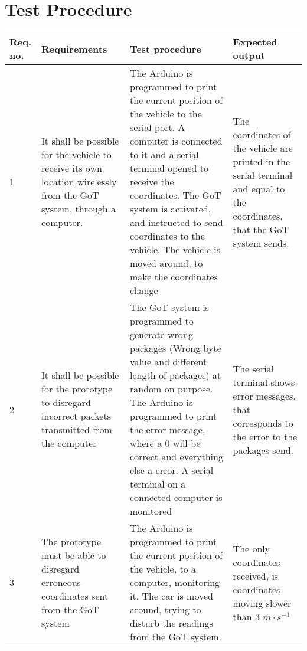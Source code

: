 \section{Test Procedure}\label{cha:TestProcedure}

\begin{table}[H] \centering
\begin{tabular}{|p{2cm}|p{5cm}|p{6cm}|p{3cm}|}
\hline%
\textbf{Req. no.}  &  \textbf{Requirements} &  \textbf{Test procedure}  &  \textbf{Expected output}        \\
\hline%
           1    &   It shall be possible for the vehicle to receive its own location wirelessly from the GoT system, through a computer.   &   The Arduino is programmed to print the current position of the vehicle to the serial port. A computer is connected to it and a serial terminal opened to receive the coordinates. The GoT system is activated, and instructed to send coordinates to the vehicle. The vehicle is moved around, to make the coordinates change   &   The coordinates of the vehicle are printed in the serial terminal and equal to the coordinates, that the GoT system sends. \\
\hline%
           2    &   It shall be possible for the prototype to disregard incorrect packets transmitted from the computer   &   The GoT system is programmed to generate wrong packages (Wrong byte value and different length of packages) at random on purpose. The Arduino is programmed to print the error message, where a 0 will be correct and everything else a error. A serial terminal on a connected computer is monitored  &  The serial terminal shows error messages, that corresponds to the error to the packages send. \\
\hline%
           3    &   The prototype must be able to disregard erroneous coordinates sent from the GoT system   &    The Arduino is programmed to print the current position of the vehicle, to a computer, monitoring it. The car is moved around, trying to disturb the readings from the GoT system. &  The only coordinates received, is coordinates moving slower than 3 $m \cdot s^{-1}$ \\

\end{tabular}
\end{table}
